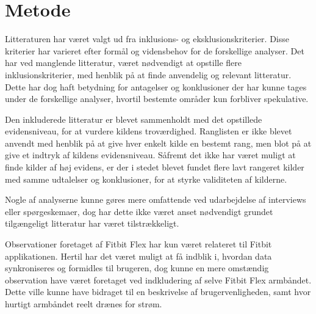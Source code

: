 \section{Metode}
Litteraturen har været valgt ud fra inklusions- og eksklusionskriterier. Disse kriterier har varieret efter formål og vidensbehov for de forskellige analyser. Det har ved manglende litteratur, været nødvendigt at opstille flere inklusionskriterier, med henblik på at finde anvendelig og relevant litteratur. Dette har dog haft betydning for antagelser og konklusioner der har kunne tages under de forskellige analyser, hvortil bestemte områder kun forbliver spekulative. 

Den inkluderede litteratur er blevet sammenholdt med det opstillede evidensniveau, for at vurdere kildens troværdighed. Ranglisten er ikke blevet anvendt med henblik på at give hver enkelt kilde en bestemt rang, men blot på at give et indtryk af kildens evidensniveau. Såfremt det ikke har været muligt at finde kilder af høj evidens, er der i stedet blevet fundet flere lavt rangeret kilder med samme udtalelser og konklusioner, for at styrke validiteten af kilderne. 

Nogle af analyserne kunne gøres mere omfattende ved udarbejdelse af interviews eller spørgeskemaer, dog har dette ikke været anset nødvendigt grundet tilgængeligt litteratur har været tilstrækkeligt.

Observationer foretaget af Fitbit Flex har kun været relateret til Fitbit applikationen. Hertil har det været muligt at få indblik i, hvordan data synkroniseres og formidles til brugeren, dog kunne en mere omstændig observation have været foretaget ved indkludering af selve Fitbit Flex armbåndet. Dette ville kunne have bidraget til en beskrivelse af brugervenligheden, samt hvor hurtigt armbåndet reelt drænes for strøm.  
